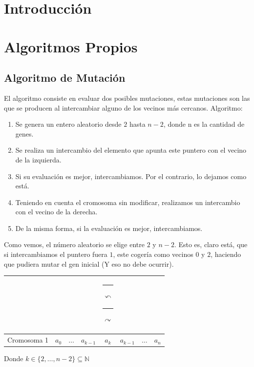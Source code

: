 \documentclass{article}
\def\MCr{
	\multicolumn{1}{c}{
		\rule{-5pt}{0ex}$\stackrel{}{\curvearrowleft}$
		\rule{+20pt}{0ex}$\stackrel{}{\curvearrowright}$
	}
}
\def\MCe{\multicolumn{1}{c}{}}
\begin{document}
\section{Introducción}

\newpage

\section{Algoritmos Propios}

\subsection{Algoritmo de Mutación}
El algoritmo consiste en evaluar dos posibles mutaciones, estas mutaciones son las que se producen al intercambiar alguno de los vecinos más cercanos.
Algoritmo:
\begin{enumerate}
	\item Se genera un entero aleatorio desde $2$ hasta $n-2$, donde n es la cantidad de genes.
	\item Se realiza un intercambio del elemento que apunta este puntero con el vecino de la izquierda.
	\item Si su evaluación es mejor, intercambiamos. Por el contrario, lo dejamos como está.
	\item Teniendo en cuenta el cromosoma sin modificar, realizamos un intercambio con el vecino de la derecha.
	\item De la misma forma, si la evaluación es mejor, intercambiamos.
\end{enumerate}

Como vemos, el número aleatorio se elige entre $2$ y $n-2$. Esto es, claro está, que si intercambiamos el puntero fuera $1$, este cogería como vecinos $0$ y $2$, haciendo que pudiera mutar el gen inicial (Y eso no debe ocurrir).


\begin{tabular}{|l|*7{c|}}
	\MCe & \MCe & \MCe & \MCe & \MCr & \MCe & \MCe \\\hline
	Cromosoma 1 & $a_0$ & $\dots$ & $a_{k-1}$ & $a_{k}$ & $a_{k-1}$ & $\dots$ & $a_{n}$ \\\hline
\end{tabular}
\newline\newline
Donde $k\in \{2, \dots, n-2\}\subseteq\mathbb{N}$

\end{document}
